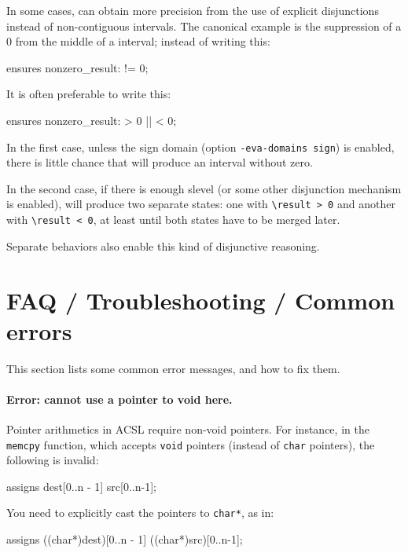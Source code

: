 \documentclass{frama-c-book}
\begin{document}
In some cases, \Eva{} can obtain more precision from the use of explicit
disjunctions instead of non-contiguous intervals. The canonical example
is the suppression of a 0 from the middle of a interval; instead of writing
this:

\begin{listing-nonumber}
  ensures nonzero_result: \result != 0;
\end{listing-nonumber}

It is often preferable to write this:

\begin{listing-nonumber}
  ensures nonzero_result: \result > 0 || \result < 0;
\end{listing-nonumber}

In the first case, unless the sign domain (option \texttt{-eva-domains sign})
is enabled, there is little chance that \Eva{} will produce an interval without
zero.

In the second case, if there is enough slevel (or some other disjunction
mechanism is enabled), \Eva{} will produce two separate states: one with
\verb+\result > 0+ and another with \verb+\result < 0+,
at least until both states have to be merged later.

Separate behaviors also enable this kind of disjunctive reasoning.

\section{FAQ / Troubleshooting / Common errors}
\label{sec:acsl-guide-faq}

This section lists some common error messages, and how to fix them.

\paragraph{Error: cannot use a pointer to void here.}
Pointer arithmetics in ACSL require non-void pointers. For instance,
in the \texttt{memcpy} function, which accepts \texttt{void} pointers
(instead of \texttt{char} pointers), the following is invalid:

\begin{listing-nonumber}
  assigns dest[0..n - 1] \from src[0..n-1];
\end{listing-nonumber}

You need to explicitly cast the pointers to \texttt{char*}, as in:

\begin{listing-nonumber}
  assigns ((char*)dest)[0..n - 1] \from ((char*)src)[0..n-1];
\end{listing-nonumber}
\end{document}

